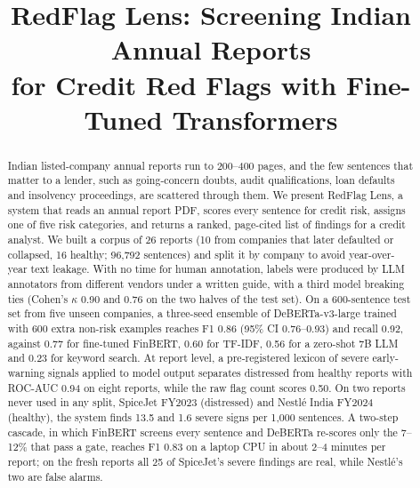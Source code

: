 \documentclass[conference]{IEEEtran}
\begin{document}
\title{RedFlag Lens: Screening Indian Annual Reports\\for Credit Red Flags with Fine-Tuned Transformers}

\author{
\and
{}
}

\maketitle

\begin{abstract}
Indian listed-company annual reports run to 200--400 pages, and the few sentences that matter to a lender, such as going-concern doubts, audit qualifications, loan defaults and insolvency proceedings, are scattered through them. We present RedFlag Lens, a system that reads an annual report PDF, scores every sentence for credit risk, assigns one of five risk categories, and returns a ranked, page-cited list of findings for a credit analyst. We built a corpus of 26 reports (10 from companies that later defaulted or collapsed, 16 healthy; 96,792 sentences) and split it by company to avoid year-over-year text leakage. With no time for human annotation, labels were produced by LLM annotators from different vendors under a written guide, with a third model breaking ties (Cohen's $\kappa$ 0.90 and 0.76 on the two halves of the test set). On a 600-sentence test set from five unseen companies, a three-seed ensemble of DeBERTa-v3-large trained with 600 extra non-risk examples reaches F1 0.86 (95\% CI 0.76--0.93) and recall 0.92, against 0.77 for fine-tuned FinBERT, 0.60 for TF-IDF, 0.56 for a zero-shot 7B LLM and 0.23 for keyword search. At report level, a pre-registered lexicon of severe early-warning signals applied to model output separates distressed from healthy reports with ROC-AUC 0.94 on eight reports, while the raw flag count scores 0.50. On two reports never used in any split, SpiceJet FY2023 (distressed) and Nestl\'e India FY2024 (healthy), the system finds 13.5 and 1.6 severe signs per 1,000 sentences. A two-step cascade, in which FinBERT screens every sentence and DeBERTa re-scores only the 7--12\% that pass a gate, reaches F1 0.83 on a laptop CPU in about 2--4 minutes per report; on the fresh reports all 25 of SpiceJet's severe findings are real, while Nestl\'e's two are false alarms.
\end{abstract}
\end{document}
